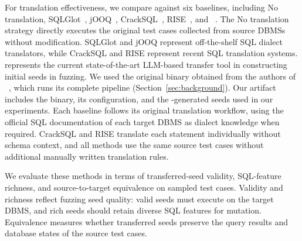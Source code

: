 \documentclass[conference]{IEEEtran}
\begin{document}
For translation effectiveness, we compare \tool{} against six baselines, including No translation, SQLGlot~\cite{sqlglot}, jOOQ~\cite{jooq}, CrackSQL~\cite{zhou2025cracking}, RISE~\cite{xie2026rise}, and \sedar{}~\cite{fu2024sedar}. 
The No translation strategy directly executes the original test cases collected from source DBMSs without modification. 
SQLGlot and jOOQ represent off-the-shelf SQL dialect translators, while CrackSQL and RISE represent recent SQL translation systems.
\sedar{} represents the current state-of-the-art LLM-based transfer tool in constructing initial seeds in fuzzing. 
We used the original \sedar{} binary obtained from the authors of \sedar{}~\cite{fu2024sedar}, which runs its complete pipeline (Section~\ref{sec:background}).
Our artifact includes the \sedar{} binary, its configuration, and the \sedar{}-generated seeds used in our experiments.
Each baseline follows its original translation workflow, using the official SQL documentation of each target DBMS as dialect knowledge when required.
CrackSQL and RISE translate each statement individually without schema context, and all methods use the same source test cases without additional manually written translation rules.


We evaluate these methods in terms of transferred-seed validity, SQL-feature richness, and source-to-target equivalence on sampled test cases.
Validity and richness reflect fuzzing seed quality: valid seeds must execute on the target DBMS, and rich seeds should retain diverse SQL features for mutation. Equivalence measures whether transferred seeds preserve the query results and database states of the source test cases.
\end{document}
